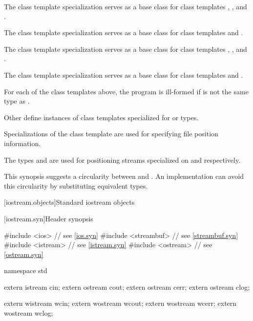 \pnum
The
class template specialization
serves as a base class for class templates
,
,
and
.

\pnum
The
class template specialization
serves as a base class for class templates
and
.

\pnum
The
class template specialization
serves as a base class for class templates
,
,
and
.

\pnum
The
class template specialization
serves as a base class for class templates
and
.

\pnum
\begin{note}
For each of the class templates above,
the program is ill-formed if
is not the same type as
.
\end{note}

\pnum
Other  define instances of
class templates
specialized for
or
types.

\pnum
Specializations of the class template
are
used for specifying file position information.
\begin{example}
The types
and
are used for positioning streams specialized on
and
respectively.
\end{example}

\pnum
\begin{note}
This synopsis suggests a circularity between
and
.
An implementation can avoid this circularity by substituting equivalent
types.
\end{note}

[iostream.objects]{Standard iostream objects}

[iostream.syn]{Header  synopsis}
%

\begin{codeblock}
#include <ios>          // see \ref{ios.syn}
#include <streambuf>    // see \ref{streambuf.syn}
#include <istream>      // see \ref{istream.syn}
#include <ostream>      // see \ref{ostream.syn}

namespace std {
  extern istream cin;
  extern ostream cout;
  extern ostream cerr;
  extern ostream clog;

  extern wistream wcin;
  extern wostream wcout;
  extern wostream wcerr;
  extern wostream wclog;
}
\end{codeblock}

